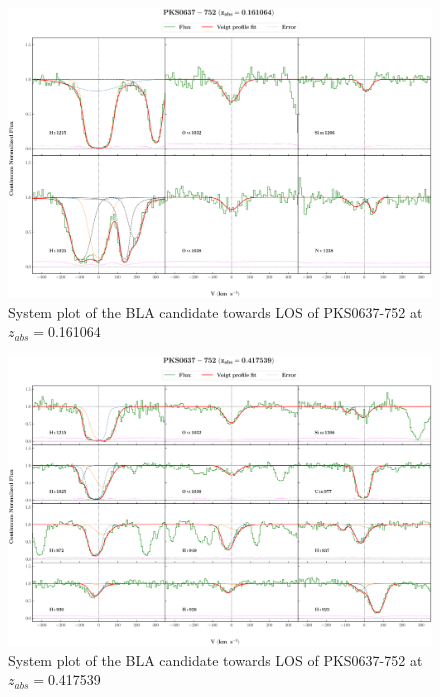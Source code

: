 \begin{landscape}
\begin{figure} 
  \centering  
  \hspace*{-21mm}
    \includegraphics[width=\linewidth]{Figures//system-plots/PKS0637-752_z=0.161064_sys_plot.png} 
  \caption{System plot of the BLA candidate towards LOS of PKS0637-752 at $z_{abs}=$0.161064} 
\end{figure}



\begin{figure} 
  \centering  
  \hspace*{-21mm}
    \includegraphics[width=\linewidth]{Figures//system-plots/PKS0637-752_z=0.417539_sys_plot.png} 
  \caption{System plot of the BLA candidate towards LOS of PKS0637-752 at $z_{abs}=$0.417539} 
\end{figure}




\end{landscape}
